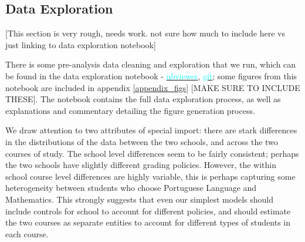 \documentclass[12pt]{article}
\begin{document}
\subsection{Data Exploration}
\textcolor{BrickRed}{[This section is very rough, needs work. not sure how much to include here vs just linking to data exploration notebook]}

There is some pre-analysis data cleaning and exploration that we run, which can be found in the data exploration notebook - \href{https://nbviewer.jupyter.org/github/nadavtadelis/Reproducible_Metrics/blob/master/data_exploration.ipynb}{\textcolor{cyan}{nbviewer}}, \href{https://github.com/nadavtadelis/Reproducible_Metrics/blob/master/data_exploration.ipynb}{\textcolor{cyan}{git}}; some figures from this notebook are included in appendix \ref{appendix_figs} \textcolor{BrickRed}{[MAKE SURE TO INCLUDE THESE]}. The notebook contains the full data exploration process, as well as explanations and commentary detailing the figure generation process.

We draw attention to two attributes of special import: there are stark differences in the distributions of the data between the two schools, and across the two courses of study. The school level differences seem to be fairly consistent; perhaps the two schools have slightly different grading policies. However, the within school course level differences are highly variable, this is perhaps capturing some heterogeneity between students who choose Portuguese Language and Mathematics. This strongly suggests that even our simplest models should include controls for school to account for different policies, and should estimate the two courses as separate entities to account for different types of students in each course.


\end{document}
